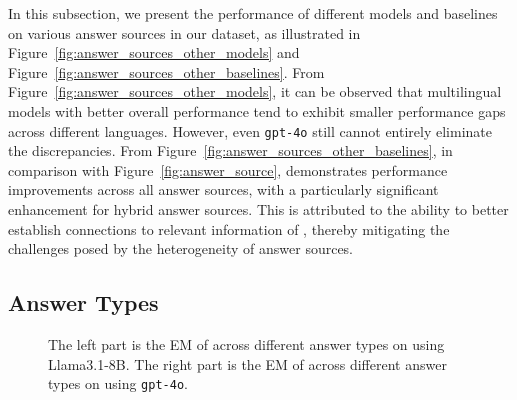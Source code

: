 In this subsection, we present the performance of different models and baselines on various answer sources in our dataset, as illustrated in Figure~\ref{fig:answer_sources_other_models} and Figure~\ref{fig:answer_sources_other_baselines}.
From Figure~\ref{fig:answer_sources_other_models}, it can be observed that multilingual models with better overall performance tend to exhibit smaller performance gaps across different languages. 
However, even \texttt{gpt-4o} still cannot entirely eliminate the discrepancies.
From Figure~\ref{fig:answer_sources_other_baselines}, in comparison with Figure~\ref{fig:answer_source}, \ourmethod demonstrates performance improvements across all answer sources, with a particularly significant enhancement for hybrid answer sources. 
This is attributed to the ability to better establish connections to relevant information of \ourmethod, thereby mitigating the challenges posed by the heterogeneity of answer sources.


\subsection{Answer Types}
\label{subsec:appendix_answer_types}

\begin{figure*}[t]
    \centering
    \begin{subfigure}[b]{0.48\linewidth}
        \centering
        
    \end{subfigure}
    \hfill %
    \begin{subfigure}[b]{0.48\linewidth}
        \centering
        
    \end{subfigure}
    \vspace{-1em}
    \caption{
        The left part is the EM of \ourmethod across different answer types on \ourdataset using Llama3.1-8B.
        The right part is the EM of \ourmethod across different answer types on \ourdataset using \texttt{gpt-4o}.
    } 
    \label{fig:answer_types_other_models}
    \vspace{-1em}
\end{figure*}


